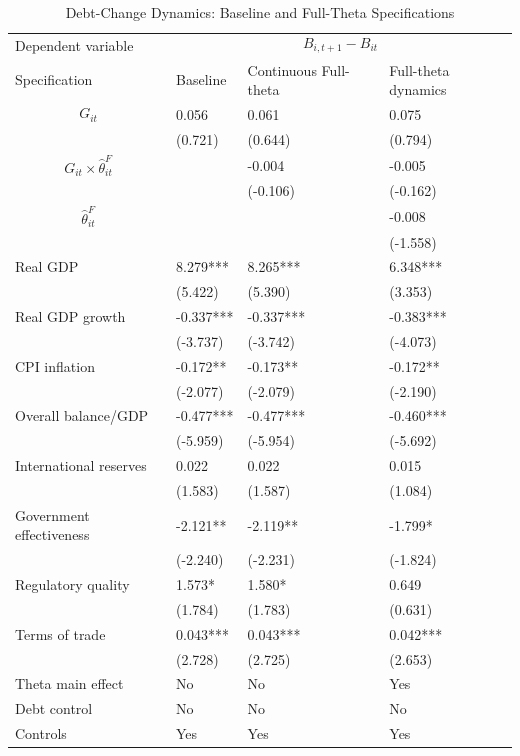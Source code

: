\begin{table}[H]\centering
\begin{threeparttable}
\caption{Debt-Change Dynamics: Baseline and Full-Theta Specifications}
\label{tab:debt_change_combined_fulltheta}
\scriptsize
\begin{tabularx}{\textwidth}{lYYY}
\toprule
Dependent variable &  \\
\cmidrule(lr){2-4}
Specification & Baseline & Continuous Full-theta & Full-theta dynamics \\
\midrule
$$G_{it}$$ & 0.056 & 0.061 & 0.075 \\
 & (0.721) & (0.644) & (0.794) \\
$$G_{it}\times\widehat{\theta}^{F}_{it}$$ &  & -0.004 & -0.005 \\
 &  & (-0.106) & (-0.162) \\
$$\widehat{\theta}^{F}_{it}$$ &  &  & -0.008 \\
 &  &  & (-1.558) \\
Real GDP & 8.279*** & 8.265*** & 6.348*** \\
 & (5.422) & (5.390) & (3.353) \\
Real GDP growth & -0.337*** & -0.337*** & -0.383*** \\
 & (-3.737) & (-3.742) & (-4.073) \\
CPI inflation & -0.172** & -0.173** & -0.172** \\
 & (-2.077) & (-2.079) & (-2.190) \\
Overall balance/GDP & -0.477*** & -0.477*** & -0.460*** \\
 & (-5.959) & (-5.954) & (-5.692) \\
International reserves & 0.022 & 0.022 & 0.015 \\
 & (1.583) & (1.587) & (1.084) \\
Government effectiveness & -2.121** & -2.119** & -1.799* \\
 & (-2.240) & (-2.231) & (-1.824) \\
Regulatory quality & 1.573* & 1.580* & 0.649 \\
 & (1.784) & (1.783) & (0.631) \\
Terms of trade & 0.043*** & 0.043*** & 0.042*** \\
 & (2.728) & (2.725) & (2.653) \\
\midrule
Theta main effect & No & No & Yes \\
Debt control & No & No & No \\
Controls & Yes & Yes & Yes \\

\end{tabularx}
\end{threeparttable}
\end{table}
